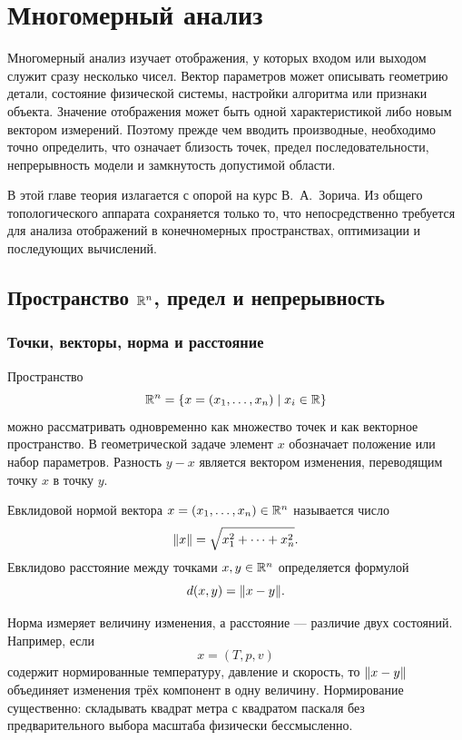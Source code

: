 \chapter{Многомерный анализ}
\label{chap:multivariable-calculus}

Многомерный анализ изучает отображения, у которых входом или выходом служит сразу несколько чисел. Вектор параметров может описывать геометрию детали, состояние физической системы, настройки алгоритма или признаки объекта. Значение отображения может быть одной характеристикой либо новым вектором измерений. Поэтому прежде чем вводить производные, необходимо точно определить, что означает близость точек, предел последовательности, непрерывность модели и замкнутость допустимой области.

В этой главе теория излагается с опорой на курс В.~А.~Зорича. Из общего топологического аппарата сохраняется только то, что непосредственно требуется для анализа отображений в конечномерных пространствах, оптимизации и последующих вычислений.

\section{Пространство \texorpdfstring{$\mathbb{R}^n$}{R n}, предел и непрерывность}
\label{sec:rn-limit-continuity}

\subsection{Точки, векторы, норма и расстояние}

Пространство
\[
\mathbb{R}^n
=
\{x=(x_1,\dots,x_n)\mid x_i\in\mathbb{R}\}
\]
можно рассматривать одновременно как множество точек и как векторное пространство. В геометрической задаче элемент \(x\) обозначает положение или набор параметров. Разность \(y-x\) является вектором изменения, переводящим точку \(x\) в точку \(y\).

\begin{definition}
Евклидовой нормой вектора \(x=(x_1,\dots,x_n)\in\mathbb{R}^n\) называется число
\[
\lVert x\rVert
=
\sqrt{x_1^2+\cdots+x_n^2}.
\]
Евклидово расстояние между точками \(x,y\in\mathbb{R}^n\) определяется формулой
\[
d(x,y)=\lVert x-y\rVert.
\]
\end{definition}

Норма измеряет величину изменения, а расстояние --- различие двух состояний. Например, если
\[
x=(T,p,v)
\]
содержит нормированные температуру, давление и скорость, то \(\lVert x-y\rVert\) объединяет изменения трёх компонент в одну величину. Нормирование существенно: складывать квадрат метра с квадратом паскаля без предварительного выбора масштаба физически бессмысленно.

